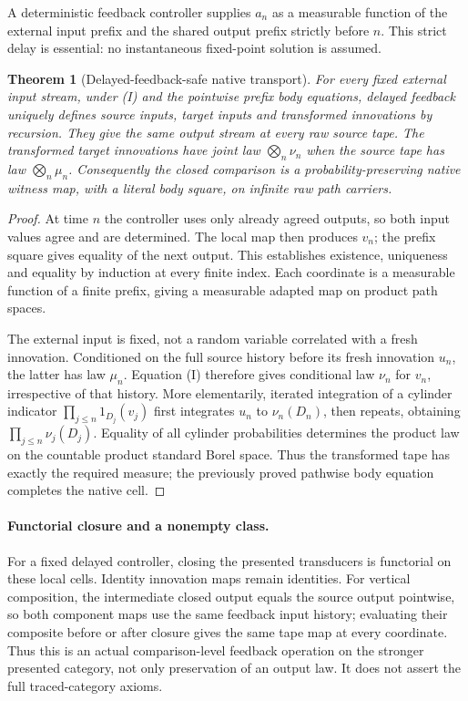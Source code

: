 \documentclass[11pt]{article}
\newtheorem{theorem}{Theorem}[section]
\begin{document}
A deterministic feedback controller supplies $a_n$ as a measurable function of the external input prefix and the shared output prefix strictly before $n$. This strict delay is essential: no instantaneous fixed-point solution is assumed.
\begin{theorem}[Delayed-feedback-safe native transport]\label{kernel:safe}
For every fixed external input stream, under (I) and the pointwise prefix body equations, delayed feedback uniquely defines source inputs, target inputs and transformed innovations by recursion. They give the same output stream at every raw source tape. The transformed target innovations have joint law $\bigotimes_n\nu_n$ when the source tape has law $\bigotimes_n\mu_n$. Consequently the closed comparison is a probability-preserving native witness map, with a literal body square, on infinite raw path carriers.
\end{theorem}
\begin{proof}
At time $n$ the controller uses only already agreed outputs, so both input values agree and are determined. The local map then produces $v_n$; the prefix square gives equality of the next output. This establishes existence, uniqueness and equality by induction at every finite index. Each coordinate is a measurable function of a finite prefix, giving a measurable adapted map on product path spaces.

The external input is fixed, not a random variable correlated with a fresh innovation. Conditioned on the full source history before its fresh innovation $u_n$, the latter has law $\mu_n$. Equation (I) therefore gives conditional law $\nu_n$ for $v_n$, irrespective of that history. More elementarily, iterated integration of a cylinder indicator $\prod_{j\le n}1_{D_j}(v_j)$ first integrates $u_n$ to $\nu_n(D_n)$, then repeats, obtaining $\prod_{j\le n}\nu_j(D_j)$. Equality of all cylinder probabilities determines the product law on the countable product standard Borel space. Thus the transformed tape has exactly the required measure; the previously proved pathwise body equation completes the native cell.
\end{proof}

\paragraph{Functorial closure and a nonempty class.} For a fixed delayed controller, closing the presented transducers is functorial on these local cells. Identity innovation maps remain identities. For vertical composition, the intermediate closed output equals the source output pointwise, so both component maps use the same feedback input history; evaluating their composite before or after closure gives the same tape map at every coordinate. Thus this is an actual comparison-level feedback operation on the stronger presented category, not only preservation of an output law. It does not assert the full traced-category axioms.
\end{document}
